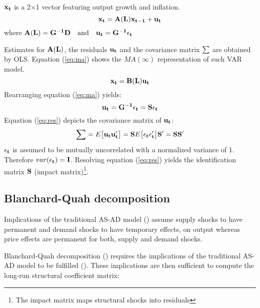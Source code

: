 ${\bf x_t}$ is a 2$\times$1 vector featuring output growth and inflation.
\begin{equation}
	{\bf x_t} = {\bf A(L)x_{t-1}} + {\bf u_t}
\label{eq:var2}
\end{equation}
where
$
{\bf A(L)}
=
{\bf G^{-1}D}
\quad
\textrm{and}
\quad
{\bf u_t}
=
{\bf G^{-1}}
{\bf \epsilon_t}
$

Estimates for ${\bf A(L)}$, the residuals ${\bf u_t}$ and the covariance matrix ${\bf \sum}$ are obtained by OLS. Equation (\ref{eq:ma}) shows the $MA(\infty)$ representation of such VAR model.
\begin{equation}
{\bf x_t}
=
{\bf B(L)u_t}
\label{eq:ma}
\end{equation}
Rearranging equation (\ref{eq:ma}) yields:
\begin{equation}
{\bf u_t}
=
{\bf G^{-1}\epsilon_t}
=
{\bf S\epsilon_t}
\label{eq:response}
\end{equation}
Equation (\ref{eq:res}) depicts the covariance matrix of ${\bf u_t}$:
\begin{equation}
{\bf \sum} = E \big[ {\bf u_t u'_t} \big] = {\bf S}E \big[ {\bf \epsilon_t \epsilon'_t} \big] {\bf S'} = {\bf SS'}
\label{eq:res}
\end{equation}
${\bf \epsilon_t}$ is assumed to be mutually uncorrelated with a normalized variance of 1. Therefore $var({\bf \epsilon_t})={\bf I}$.
Resolving equation (\ref{eq:res}) yields the identification matrix ${\bf S}$ (impact matrix)\footnote{The impact matrix maps structural shocks into residuals}. 

\subsection{Blanchard-Quah decomposition}
\label{s:bq}
Implications of the traditional AS-AD model (\cite{favero}) assume supply shocks to have permanent and demand shocks to have temporary effects, on output whereas price effects are permanent for both, supply and demand shocks.

Blanchard-Quah decomposition (\cite{blanchard}) requires the implications of the traditional AS-AD model to be fulfilled (\cite{favero}). These implications are then sufficient to compute the long-run structural coefficient matrix:

